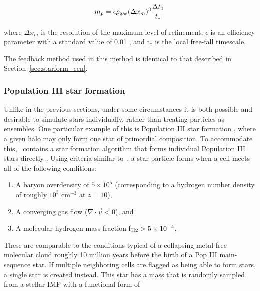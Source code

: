 \begin{equation} 
m_p = \epsilon \rho_{\rm gas} (\Delta x_{m})^3 \frac{\Delta t_0}{t_*}
\end{equation}

where $\Delta x_{m}$ is the resolution of the maximum level of
refinement, $\epsilon$ is an efficiency parameter with a standard
value of 0.01 \citep[as motivated by][]{2007ApJ...654..304K}, and
t$_*$ is the local free-fall timescale.

The feedback method used in this method is identical to that described
in Section~\ref{sec:starform_cen}.

\subsubsection{Population III star formation}
\label{sec:starform_pop3}

Unlike in the previous sections, under some circumstances it is both
possible and desirable to simulate stars individually, rather than
treating particles as ensembles.  One particular example of this is
Population III star formation
\citep{ABN02,2007ApJ...654...66O,2008ApJ...685...40W,2009Sci...325..601T},
where a given halo may only form one star of primordial composition.
To accommodate this, \enzo\ contains a star formation algorithm that
forms individual Population III stars directly \citep{2007ApJ...659L..87A,
  2008ApJ...685...40W, 2012MNRAS.427..311W}.  Using criteria similar
to~\citet{CO1992}, a star particle forms when a cell meets all of the
following conditions:

\begin{enumerate}
\item A baryon overdensity of $5 \times 10^5$ (corresponding to a
  hydrogen number density of 
  roughly $10^3$ cm$^{-3}$ at $z=10$),

\item A converging gas flow ($\nabla \cdot \vec{v} < 0$), and

\item A molecular hydrogen mass fraction f$_{\rm H2} > 5 \times 10^{-4}$,
\end{enumerate}

These are comparable to the conditions typical of a collapsing metal-free molecular cloud roughly
10 million years before the birth of a Pop III main-sequence star.  If
multiple neighboring cells are flagged as being able to form stars, a
single star is created instead.  This star has a mass that is randomly
sampled from a stellar IMF with a functional form of

